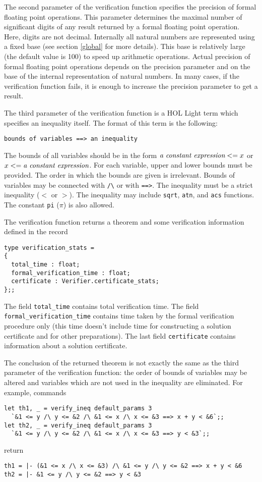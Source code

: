 \documentclass[a4paper]{article}
\begin{document}
The second parameter of the verification function specifies the precision of formal floating point operations. This parameter determines the maximal number of significant digits of any result returned by a formal floating point operation. Here, digits are not decimal. Internally all natural numbers are represented using a fixed base (see section \ref{global} for more details). This base is relatively large (the default value is 100) to speed up arithmetic operations. Actual precision of formal floating point operations depends on the precision parameter and on the base of the internal representation of natural numbers. In many cases, if the verification function fails, it is enough to increase the precision parameter to get a result.

The third parameter of the verification function is a HOL Light term which specifies an inequality itself. The format of this term is the following:
\begin{verbatim}
bounds of variables ==> an inequality
\end{verbatim}
The bounds of all variables should be in the form $\text{\it a constant expression} <= x$ or $x <= \text{\it a constant expression}$. For each variable, upper and lower bounds must be provided. The order in which the bounds are given is irrelevant. Bounds of variables may be connected with \verb|/\| or with \verb|==>|. The inequality must be a strict inequality ($<$ or $>$). The inequality may include \verb|sqrt|, \verb|atn|, and \verb|acs| functions. The constant \verb|pi| ($\pi$) is also allowed.

The verification function returns a theorem and some verification information defined in the record
\begin{verbatim}
type verification_stats =
{
  total_time : float;
  formal_verification_time : float;
  certificate : Verifier.certificate_stats;
};;
\end{verbatim}
The field \verb|total_time| contains total verification time. The field \verb|formal_verification_time| contains time taken by the formal verification procedure only (this time doesn't include time for constructing a solution certificate and for other preparations). The last field \verb|certificate| contains information about a solution certificate.

The conclusion of the returned theorem is not exactly the same as the third parameter of the verification function: the order of bounds of variables may be altered and variables which are not used in the inequality are eliminated. For example, commands
\begin{verbatim}
let th1, _ = verify_ineq default_params 3
  `&1 <= y /\ y <= &2 /\ &1 <= x /\ x <= &3 ==> x + y < &6`;;
let th2, _ = verify_ineq default_params 3
  `&1 <= y /\ y <= &2 /\ &1 <= x /\ x <= &3 ==> y < &3`;;
\end{verbatim}
return
\begin{verbatim}
th1 = |- (&1 <= x /\ x <= &3) /\ &1 <= y /\ y <= &2 ==> x + y < &6
th2 = |- &1 <= y /\ y <= &2 ==> y < &3
\end{verbatim}
\end{document}
